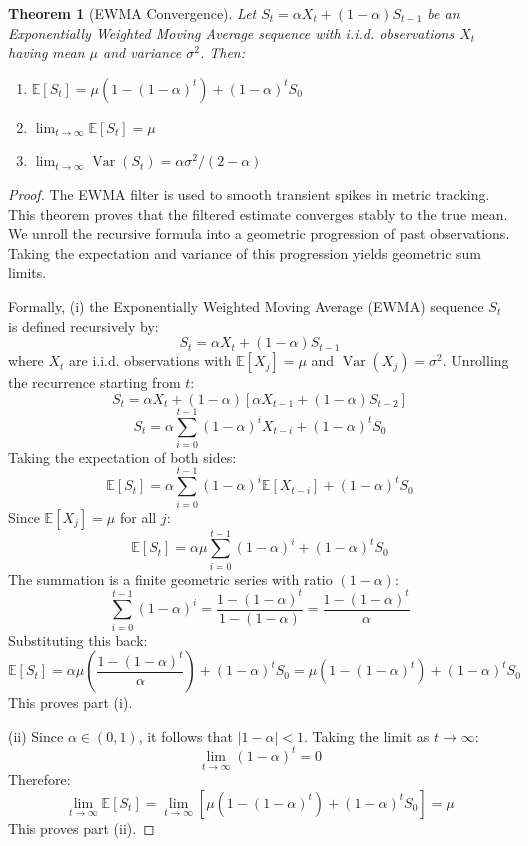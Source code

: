 \documentclass[11pt,a4paper]{article}
\theoremstyle{plain}
\newtheorem{theorem}{Theorem}[section]
\theoremstyle{definition}
\theoremstyle{remark}
\newcommand{\E}{\mathbb{E}}
\newcommand{\Var}{\operatorname{Var}}
\begin{document}
\begin{theorem}[EWMA Convergence]\label{thm:ewma}
Let $S_t = \alpha X_t + (1-\alpha) S_{t-1}$ be an Exponentially Weighted Moving Average sequence with i.i.d. observations $X_t$ having mean $\mu$ and variance $\sigma^2$. Then:
\begin{enumerate}[label=(\roman*),nosep]
  \item $\E[S_t]=\mu(1{-}(1{-}\alpha)^t)+(1{-}\alpha)^tS_0$
  \item $\lim_{t\to\infty}\E[S_t]=\mu$
  \item $\lim_{t\to\infty}\Var(S_t)=\alpha\sigma^2/(2{-}\alpha)$
\end{enumerate}
\end{theorem}
\begin{proof}
The EWMA filter is used to smooth transient spikes in metric tracking. This theorem proves that the filtered estimate converges stably to the true mean. We unroll the recursive formula into a geometric progression of past observations. Taking the expectation and variance of this progression yields geometric sum limits.

Formally, (i) the Exponentially Weighted Moving Average (EWMA) sequence $S_t$ is defined recursively by:
$$S_t = \alpha X_t + (1-\alpha) S_{t-1}$$
where $X_t$ are i.i.d. observations with $\E[X_j] = \mu$ and $\Var(X_j) = \sigma^2$. Unrolling the recurrence starting from $t$:
$$S_t = \alpha X_t + (1-\alpha) [\alpha X_{t-1} + (1-\alpha) S_{t-2}]$$
$$S_t = \alpha \sum_{i=0}^{t-1} (1-\alpha)^i X_{t-i} + (1-\alpha)^t S_0$$
Taking the expectation of both sides:
$$\E[S_t] = \alpha \sum_{i=0}^{t-1} (1-\alpha)^i \E[X_{t-i}] + (1-\alpha)^t S_0$$
Since $\E[X_j] = \mu$ for all $j$:
$$\E[S_t] = \alpha \mu \sum_{i=0}^{t-1} (1-\alpha)^i + (1-\alpha)^t S_0$$
The summation is a finite geometric series with ratio $(1-\alpha)$:
$$\sum_{i=0}^{t-1} (1-\alpha)^i = \frac{1 - (1-\alpha)^t}{1 - (1-\alpha)} = \frac{1 - (1-\alpha)^t}{\alpha}$$
Substituting this back:
$$\E[S_t] = \alpha \mu \left( \frac{1 - (1-\alpha)^t}{\alpha} \right) + (1-\alpha)^t S_0 = \mu(1 - (1-\alpha)^t) + (1-\alpha)^t S_0$$
This proves part (i).

(ii) Since $\alpha \in (0, 1)$, it follows that $|1-\alpha| < 1$. Taking the limit as $t \to \infty$:
$$\lim_{t\to\infty} (1-\alpha)^t = 0$$
Therefore:
$$\lim_{t\to\infty} \E[S_t] = \lim_{t\to\infty} \left[ \mu(1 - (1-\alpha)^t) + (1-\alpha)^t S_0 \right] = \mu$$
This proves part (ii).


\end{proof}
\end{document}
